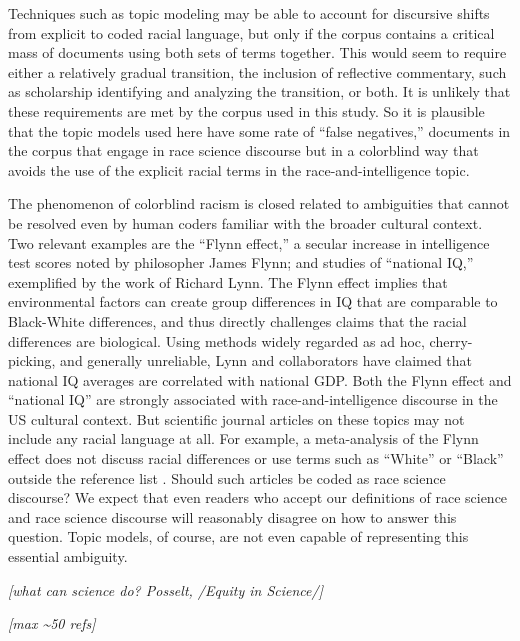 \documentclass[12pt]{article}
\begin{document}
Techniques such as topic modeling may be able to account for discursive shifts from explicit to coded racial language, but only if the corpus contains a critical mass of documents using both sets of terms together. This would seem to require either a relatively gradual transition, the inclusion of reflective commentary, such as scholarship identifying and analyzing the transition, or both. It is unlikely that these requirements are met by the corpus used in this study. So it is plausible that the topic models used here have some rate of ``false negatives,'' documents in the corpus that engage in race science discourse but in a colorblind way that avoids the use of the explicit racial terms in the race-and-intelligence topic.

The phenomenon of colorblind racism is closed related to ambiguities that cannot be resolved even by human coders familiar with the broader cultural context. Two relevant examples are the ``Flynn effect,'' a secular increase in intelligence test scores noted by philosopher James Flynn; and studies of ``national IQ,'' exemplified by the work of Richard Lynn. The Flynn effect implies that environmental factors can create group differences in IQ that are comparable to Black-White differences, and thus directly challenges claims that the racial differences are biological. Using methods widely regarded as ad hoc, cherry-picking, and generally unreliable, Lynn and collaborators have claimed that national IQ averages are correlated with national GDP. Both the Flynn effect and ``national IQ'' are strongly associated with race-and-intelligence discourse in the US cultural context. But scientific journal articles on these topics may not include any racial language at all. For example, a meta-analysis of the Flynn effect does not discuss racial differences or use terms such as ``White'' or ``Black'' outside the reference list \cite{TrahanFlynnEffectMetaanalysis2014}. Should such articles be coded as race science discourse? We expect that even readers who accept our definitions of race science and race science discourse will reasonably disagree on how to answer this question. Topic models, of course, are not even capable of representing this essential ambiguity.

\emph{{[}what can science do? Posselt, /Equity in Science/{]}}

\emph{{[}max \textasciitilde50 refs{]}}

\clearpage
\appendix
\renewcommand{\thesection}{S\arabic{section}}
\renewcommand\thefigure{\thesection.\arabic{figure}}    
\setcounter{figure}{0} 
\renewcommand\thetable{\thesection.\arabic{table}}    
\setcounter{table}{0}
\maketitle
\end{document}
